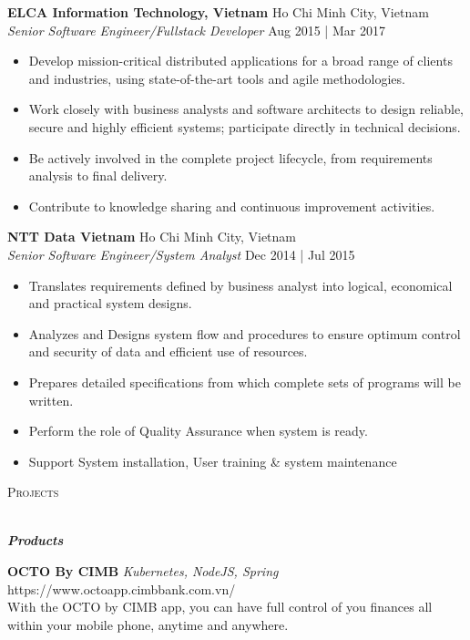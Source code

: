 \documentclass[a4paper]{article}
\newcommand{\lineunder} {
    \vspace*{-8pt} \\
    \hspace*{-18pt} \hrulefill \\
}
\newcommand{\header} [1] {
    {\hspace*{-18pt}\vspace*{6pt} \textsc{#1}}
    \vspace*{-6pt} \lineunder
}
\begin{document}
\textbf{ELCA Information Technology, Vietnam} \hfill Ho Chi Minh City, Vietnam\\
\textit{Senior Software Engineer/Fullstack Developer} \hfill Aug 2015 | Mar 2017\\
\vspace{-1mm}
\begin{itemize} \itemsep 1pt
	\item Develop mission-critical distributed applications for a broad range of clients and industries, using state-of-the-art tools and agile methodologies.
	\item Work closely with business analysts and software architects to design reliable, secure and highly efficient systems; participate directly in technical decisions.
	\item Be actively involved in the complete project lifecycle, from requirements analysis to final delivery.
	\item Contribute to knowledge sharing and continuous improvement activities.
\end{itemize}

\newpage
\textbf{NTT Data Vietnam} \hfill Ho Chi Minh City, Vietnam\\
\textit{Senior Software Engineer/System Analyst} \hfill Dec 2014 | Jul 2015\\
\vspace{-1mm}
\begin{itemize} \itemsep 1pt
	\item Translates requirements defined by business analyst into logical, economical and practical system designs.
	\item Analyzes and Designs system flow and procedures to ensure optimum control and security of data and efficient use of resources.
	\item Prepares detailed specifications from which complete sets of programs will be written.
	\item Perform the role of Quality Assurance when system is ready.
	\item Support System installation, User training \& system maintenance
\end{itemize}

\header{Projects}
\begin{center}
	\textbf{\textit{Products}}
\end{center}

{\textbf{OCTO By CIMB}} {\sl Kubernetes, NodeJS, Spring} \hfill https://www.octoapp.cimbbank.com.vn/\\
With the OCTO by CIMB app, you can have full control of you finances all within your mobile phone, anytime and anywhere.\\
\vspace*{2mm}
\end{document}
